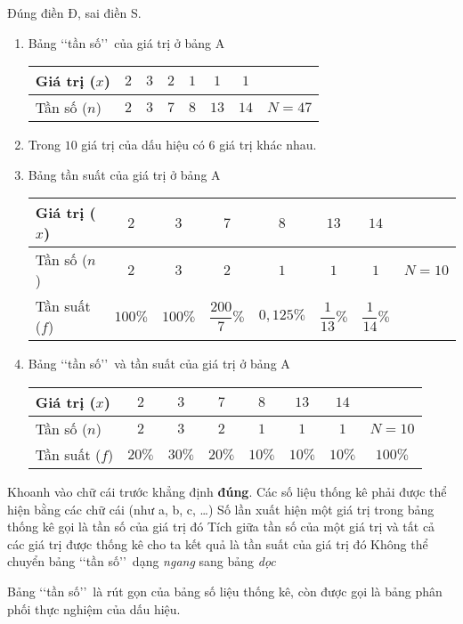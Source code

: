 \begin{ex}%
Đúng điền Đ, sai điền S.
\begin{enumerate}
\item {} Bảng \lq\lq tần số\rq\rq\ của giá trị ở bảng A
\begin{center}
	\begin{tabular}{|l|c|c|c|c|c|c|c|}
		\hline
		Giá trị ($x$) &$2$ &$3$ &$2$ &$1$ &$1$ &$1$ &\\
		\hline
		Tần số ($n$) &$2$ &$3$ &$7$ &$8$ &$13$ &$14$ &$N=47$\\
		\hline
	\end{tabular}
\end{center}
\item {} Trong $10$ giá trị của dấu hiệu có $6$ giá trị khác nhau.
\item {} Bảng tần suất của giá trị ở bảng A
\begin{center}
	\begin{tabular}{|l|c|c|c|c|c|c|c|}
		\hline
		Giá trị ($x$) &$2$ &$3$ &$7$ &$8$ &$13$ &$14$ &\\
		\hline
		Tần số ($n$) &$2$ &$3$ &$2$ &$1$ &$1$ &$1$ &$N=10$\\
		\hline
		Tần suất ($f$) &$100\%$ &$100\%$ &$\dfrac{200}{7}\%$ &$0,125\%$ &$\dfrac{1}{13}\%$ &$\dfrac{1}{14}\%$ &\\
		\hline
	\end{tabular}
\end{center}
\item {} Bảng \lq\lq tần số\rq\rq\ và tần suất của giá trị ở bảng A
\begin{center}
	\begin{tabular}{|l|c|c|c|c|c|c|c|}
		\hline
		Giá trị ($x$) &$2$ &$3$ &$7$ &$8$ &$13$ &$14$ &\\
		\hline
		Tần số ($n$) &$2$ &$3$ &$2$ &$1$ &$1$ &$1$ &$N=10$\\
		\hline
		Tần suất ($f$) &$20\%$ &$30\%$ &$20\%$ &$10\%$ &$10\%$ &$10\%$ &$100\%$\\
		\hline
	\end{tabular}
\end{center}
\end{enumerate}
\end{ex}

\begin{ex}%
	Khoanh vào chữ cái trước khẳng định \textbf{đúng}.
	\choice
	{Các số liệu thống kê phải được thể hiện bằng các chữ cái (như a, b, c, \ldots)}
	{\True Số lần xuất hiện một giá trị trong bảng thống kê gọi là tần số của giá trị đó}
	{Tích giữa tần số của một giá trị và tất cả các giá trị được thống kê cho ta kết quả là tần suất của giá trị đó}
	{Không thể chuyển bảng \lq\lq tần số\rq\rq\ dạng \textit{ngang} sang bảng \textit{dọc}}
\end{ex}
\begin{note}
	Bảng \lq\lq tần số\rq\rq\ là rút gọn của bảng số liệu thống kê, còn được gọi là bảng phân phối thực nghiệm của dấu hiệu.
\end{note}


